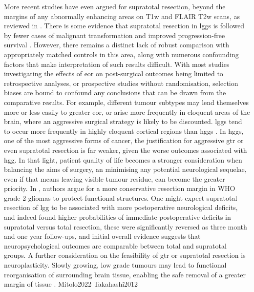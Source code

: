 More recent studies have even argued for supratotal resection, beyond the margins of any abnormally enhancing areas on T1w and FLAIR T2w scans, as reviewed in \textcite{deLeeuw2019}.
There is some evidence that supratotal resection in \glspl{lgg} is followed by fewer cases of malignant transformation and improved progression-free survival \autocite{Yordanova2011}.
However, there remains a distinct lack of robust comparison with appropriately matched controls in this area, along with numerous confounding factors that make interpretation of such results difficult.
With most studies investigating the effects of \gls{eor} on post-surgical outcomes being limited to retrospective analyses, or prospective studies without randomisation, selection biases are bound to confound any conclusions that can be drawn from the comparative results\autocite{deLeeuw2019,Keles2001}.
For example, different tumour subtypes may lend themselves more or less easily to greater \gls{eor}, or arise more frequently in eloquent areas of the brain, where an aggressive surgical strategy is likely to be discounted.\autocite{deLeeuw2019}
\Glspl{lgg} tend to occur more frequently in highly eloquent cortical regions than \glspl{hgg} \autocite{Duffau2004}.
In \glspl{hgg}, one of the most aggressive forms of cancer, the justification for aggressive \gls{gtr} or even supratotal resection is far weaker, given the worse outcomes associated with \gls{hgg}.
In that light, patient quality of life becomes a stronger consideration when balancing the aims of surgery, an minimising any potential neurological sequelae, even if that means leaving visible tumour residue, can become the greater priority.
In \textcite{Gil-Robles2010}, authors argue for a more conservative resection margin in WHO grade 2 gliomas to protect functional structures.
One might expect supratotal resection of \gls{lgg} to be associated with more postoperative neurological deficits, and indeed \textcite{Rossi2019a} found higher probabilities of immediate postoperative deficits in supratotal versus total resection, these were significantly reversed as three month and one year follow-ups, and initial overall evidence suggests that neuropsychological outcomes are comparable between total and supratotal groups\autocite{Tabor2021}.
A further consideration on the feasibility of \gls{gtr} or supratotal resection is neuroplasticity.
Slowly growing, low grade tumours may lead to functional reorganisation of surrounding brain tissue, enabling the safe removal of a greater margin of tissue . \autocite{Rossi2019a}Mitolo2022  Takahashi2012

